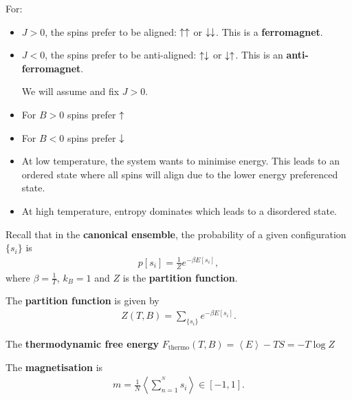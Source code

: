 For:
\begin{itemize}
    \item $J > 0$, the spins prefer to be aligned: $\uparrow \uparrow$ or $\downarrow \downarrow$. This is a \textbf{ferromagnet}.
    \item $J < 0$, the spins prefer to be anti-aligned: $\uparrow \downarrow$ or $\downarrow \uparrow$. This is an \textbf{anti-ferromagnet}.

        We will assume and fix $J > 0$.

    \item For $B > 0$ spins prefer $\uparrow$
    \item For $B < 0$ spins prefer $\downarrow$


    \item At low temperature, the system wants to minimise energy. This leads to an ordered state where all spins will align due to the lower energy preferenced state.
    \item At high temperature, entropy dominates which leads to a disordered state.
\end{itemize}

Recall that in the \textbf{canonical ensemble}, the probability of a given configuration $\{s_{i}\} $ is
\begin{align}
    p \left[ s_{i}  \right] = \frac{1}{Z} e^{-\beta E \left[ s_{i} \right] }
,\end{align}
where $\beta = \frac{1}{T}$, $k_B = 1$ and $Z$ is the \textbf{partition function}.

\begin{definition}
    The \textbf{partition function} is given by
    \begin{align}
        Z\left( T,B \right) = \sum_{\{s_{i}\} }^{} e^{-\beta E \left[ s_{i}  \right] }
    .\end{align}
\end{definition}

\begin{definition}
    The \textbf{thermodynamic free energy} $F_{\text{thermo}}\left( T,B \right) = \left<E \right> - TS = -T \log Z $ 
\end{definition}

\begin{definition}
    The \textbf{magnetisation} is 
    \begin{align}
        m = \frac{1}{N} \left<\sum_{n=1}^{^{N}}  s_{i} \right> \in \left[ -1,1 \right] 
    .\end{align}
\end{definition}

